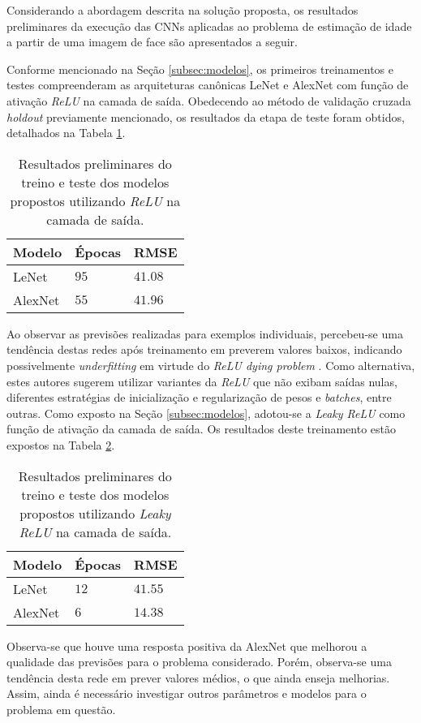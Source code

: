 
Considerando a abordagem descrita na solução proposta, os resultados preliminares da execução das CNNs aplicadas ao problema de estimação de idade a partir de uma imagem de face são apresentados a seguir.

Conforme mencionado na Seção \ref{subsec:modelos}, os primeiros treinamentos e testes compreenderam as arquiteturas canônicas LeNet e AlexNet com função de ativação \emph{ReLU} na camada de saída. Obedecendo ao método de validação cruzada \emph{holdout} previamente mencionado, os resultados da etapa de teste foram obtidos, detalhados na Tabela \ref{tab:results_relu}.


\begin{table}[h!]
     \caption{Resultados preliminares do treino e teste dos modelos propostos utilizando \emph{ReLU} na camada de saída.}
     \label{tab:results_relu}
     \centering
     \begin{tabular}{l l l}
          \toprule
          Modelo & Épocas &RMSE \\
          \midrule
          LeNet & $95$ & $41.08$ \\
          AlexNet & $55$ & $41.96$\\
          \bottomrule
     \end{tabular}
\end{table}

Ao observar as previsões realizadas para exemplos individuais, percebeu-se uma tendência destas redes após treinamento em preverem valores baixos, indicando possivelmente \emph{underfitting} em virtude do \emph{ReLU dying problem} \cite{djork2015elus, dabal2018elus}. Como alternativa, estes autores sugerem  utilizar variantes da \emph{ReLU} que não exibam saídas nulas, diferentes estratégias de inicialização e regularização de pesos e \emph{batches}, entre outras. Como exposto na Seção \ref{subsec:modelos}, adotou-se a \emph{Leaky ReLU} como função de ativação da camada de saída. Os resultados deste treinamento estão expostos na Tabela \ref{tab:results_leaky}.

\begin{table}[h!]
     \caption{Resultados preliminares do treino e teste dos modelos propostos utilizando \emph{Leaky ReLU} na camada de saída.}
     \label{tab:results_leaky}
     \centering
     \begin{tabular}{l l l}
          \toprule
          Modelo & Épocas & RMSE \\
          \midrule
          LeNet & $12$ & $41.55$ \\
          AlexNet & $6$ & $14.38$\\
          \bottomrule
     \end{tabular}
\end{table}

Observa-se que houve uma resposta positiva da AlexNet que melhorou a qualidade das previsões para o problema considerado. Porém, observa-se uma tendência desta rede em prever valores médios, o que ainda enseja melhorias. Assim, ainda é necessário investigar outros parâmetros e modelos para o problema em questão.

